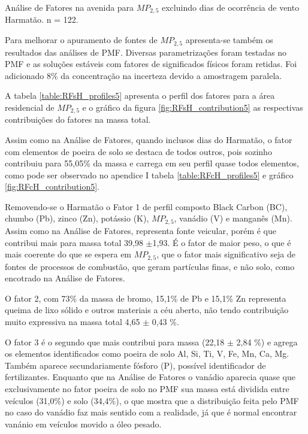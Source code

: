 \begin{table}[H]
  \centering
  
  \caption{Análise de Fatores na avenida para $MP_{2,5}$
           excluindo dias de ocorrência de vento Harmatão. n = 122.
          \label{table:AF_TFsH5}}
\end{table}
\newpage

Para melhorar o apuramento de fontes de $MP_{2,5}$ apresenta-se também os
resultados das análises de PMF. Diversas parametrizações foram testadas no PMF 
e as soluções estáveis com fatores de significados físicos foram retidas. 
Foi adicionado 8\% da concentração na incerteza devido a amostragem paralela. 

A tabela \ref{table:RFsH_profiles5} apresenta o perfil dos fatores para a área
residencial de $MP_{2,5}$ e o gráfico da figura \ref{fig:RFsH_contribution5}
as respectivas contribuições do fatores na massa total. 

Assim como na Análise de Fatores, quando inclusos dias do Harmatão, 
o fator com elementos de poeira de solo se destaca de todos outros, 
pois sozinho contribuiu para 55,05\% da massa 
e carrega em seu perfil quase todos elementos, como pode ser observado 
no apendice I tabela \ref{table:RFcH_profiles5} e gráfico 
\ref{fig:RFcH_contribution5}.

Removendo-se o Harmatão o Fator 1 de perfil composto Black Carbon (BC), 
chumbo (Pb), zinco (Zn), potássio (K), $MP_{2,5}$, vanádio (V) e manganês (Mn).
Assim como na Análise de Fatores, representa fonte veicular, porém é que 
contribui mais para massa total 39,98 $\pm$1,93. É o fator de maior peso, 
o que é mais coerente do que se espera em $MP_{2,5}$, que o fator mais 
significativo seja de fontes de processos de combustão, que geram partículas
finas, e não solo, como encotrado na Análise de Fatores.

O fator 2, com 73\% da massa de bromo, 15,1\% de Pb e 15,1\% Zn representa 
queima de lixo sólido e outros materiais a céu aberto, não tendo contribuição
muito expressiva na massa total 4,65 $\pm$ 0,43 \%.

O fator 3 é o segundo que mais contribui para massa (22,18 $\pm$ 2,84 \%) 
e agrega os elementos identificados como poeira de solo Al, Si, Ti, V, Fe, Mn, 
Ca, Mg. Também aparece secundariamente fósforo (P), possível identificador de
fertilizantes. Enquanto que na Análise de Fatores o vanádio aparecia
quase que exclusivamente no fator poeira de solo no PMF sua massa está dividida
entre veículos (31,0\%) e solo (34,4\%), o que mostra que a distribuição
feita pelo PMF no caso do vanádio faz mais sentido com a realidade, já que
é normal encontrar vanánio em veículos movido a óleo pesado.

